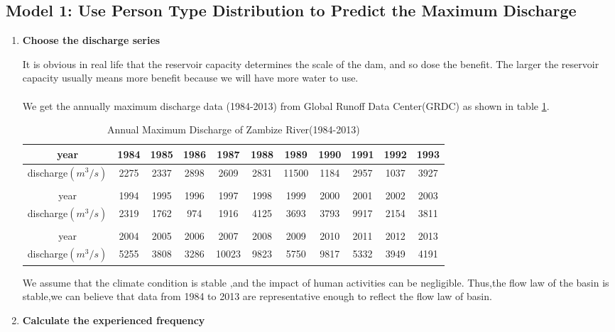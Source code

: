 \documentclass[12pt]{article}%
\newcommand{\upcite}[1]{\textsuperscript{\textsuperscript{\cite{#1}}}}%
\begin{document}
\subsection{Model 1: Use Person Type \uppercase\expandafter{} Distribution to Predict the Maximum Discharge}
\begin{enumerate}[1.]
	\item{\textbf{Choose the discharge series}} 
	\par\noindent
It is obvious in real life that the reservoir capacity determines the scale of the dam, and so dose the benefit. The larger the reservoir capacity usually means more benefit because we will have more water to use.
	\par\noindent
We get the annually maximum discharge data (1984-2013) from Global Runoff Data Center(GRDC) as shown in table \ref{discharge}.\upcite{grdc}
\begin{table}[H]
\centering
\footnotesize
\caption{Annual Maximum Discharge of Zambize River(1984-2013)}
\label{discharge}
\begin{tabular}{ccccccccccc}
\hline
year  &  1984  &  1985  &  1986  &  1987  &  1988  &  1989  &  1990  &  1991  &  1992  &  1993\\
\hline
discharge$(m^3/s)$  &  2275  &  2337  &  2898  &  2609  &  2831  &  11500  &  1184  &  2957  &  1037  &  3927\\
\hline
\\
\hline
year  &  1994  &  1995  &  1996  &  1997  &  1998  &  1999  &  2000  &  2001  &  2002  &  2003\\
\hline
discharge$(m^3/s)$  &  2319  &  1762  &  974  &  1916  &  4125  &  3693  &  3793  &  9917  &  2154  &  3811\\
\hline
\\
\hline
year  &  2004  &  2005  &  2006  &  2007  &  2008  &  2009  &  2010  &  2011  &  2012  &  2013\\
\hline
discharge$(m^3/s)$  &  5255  &  3808  &  3286  &  10023  &  9823  &  5750  &  9817  &  5332  &  3949  &  4191\\
\hline
\end{tabular}
\end{table}
We assume that the climate condition is stable ,and the impact of human activities can be negligible. Thus,the flow law of the basin is stable,we can believe that data from 1984 to 2013 are representative enough to reflect the flow law of basin.
	\item{\textbf{Calculate the experienced frequency}}

\end{enumerate}
\end{document}
